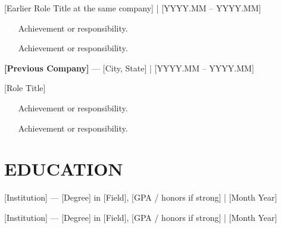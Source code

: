 \documentclass[11pt,letterpaper]{article}
\begin{document}
[Earlier Role Title at the same company] | [YYYY.MM -- YYYY.MM]
\begin{itemize}
\item [Achievement or responsibility.]
\item [Achievement or responsibility.]
\end{itemize}

\textbf{[Previous Company]} --- [City, State] | [YYYY.MM -- YYYY.MM]

[Role Title]
\begin{itemize}
\item [Achievement or responsibility.]
\item [Achievement or responsibility.]
\end{itemize}

\section*{EDUCATION}

[Institution] --- [Degree] in [Field], [GPA / honors if strong] | [Month Year]

[Institution] --- [Degree] in [Field], [GPA / honors if strong] | [Month Year]
\end{document}
